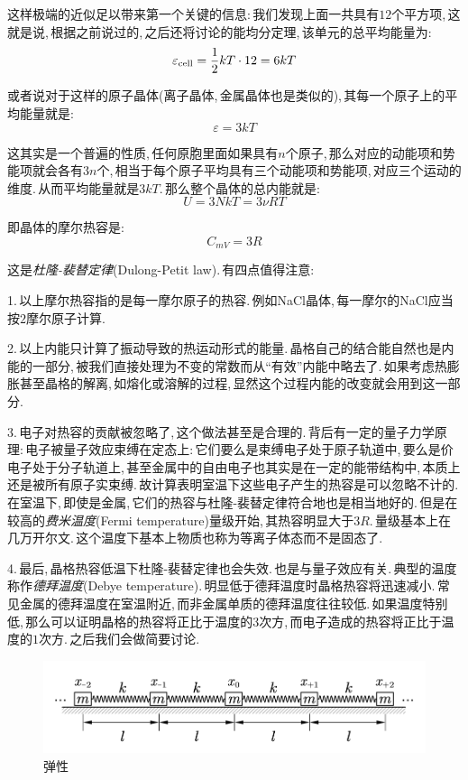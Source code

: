 这样极端的近似足以带来第一个关键的信息:\,我们发现上面一共具有$12$个平方项,\,这就是说,\,根据之前说过的,\,之后还将讨论的能均分定理,\,该单元的总平均能量为:
\[\varepsilon_{\rm cell}=\frac{1}{2}kT\cdot 12=6kT\]

或者说对于这样的原子晶体(离子晶体,\,金属晶体也是类似的),\,其每一个原子上的平均能量就是:
\[\varepsilon=3kT\]

这其实是一个普遍的性质,\,任何原胞里面如果具有$n$个原子,\,那么对应的动能项和势能项就会各有$3n$个,\,相当于每个原子平均具有三个动能项和势能项,\,对应三个运动的维度.\,从而平均能量就是$3kT$.\,那么整个晶体的总内能就是:
\[U=3NkT=3\nu RT\]

即晶体的摩尔热容是:
\[C_{mV}=3R\]

这是\emph{杜隆-裴替定律}(Dulong-Petit law).\,有四点值得注意:

1.\,以上摩尔热容指的是每一摩尔原子的热容.\,例如NaCl晶体,\,每一摩尔的NaCl应当按$2$摩尔原子计算.

2.\,以上内能只计算了振动导致的热运动形式的能量.\,晶格自己的结合能自然也是内能的一部分,\,被我们直接处理为不变的常数而从``有效''内能中略去了.\,如果考虑热膨胀甚至晶格的解离,\,如熔化或溶解的过程,\,显然这个过程内能的改变就会用到这一部分.

3.\,电子对热容的贡献被忽略了,\,这个做法甚至是合理的.\,背后有一定的量子力学原理:\,电子被量子效应束缚在定态上:\,它们要么是束缚电子处于原子轨道中,\,要么是价电子处于分子轨道上,\,甚至金属中的自由电子也其实是在一定的能带结构中,\,本质上还是被所有原子实束缚.\,故计算表明室温下这些电子产生的热容是可以忽略不计的.\,在室温下,\,即使是金属,\,它们的热容与杜隆-裴替定律符合地也是相当地好的.\,但是在较高的\emph{费米温度}(Fermi temperature)量级开始,\,其热容明显大于$3R$.\,量级基本上在几万开尔文.\,这个温度下基本上物质也称为等离子体态而不是固态了.

4.\,最后,\,晶格热容低温下杜隆-裴替定律也会失效.\,也是与量子效应有关.\,典型的温度称作\emph{德拜温度}(Debye temperature).\,明显低于德拜温度时晶格热容将迅速减小.\,常见金属的德拜温度在室温附近,\,而非金属单质的德拜温度往往较低.\,如果温度特别低,\,那么可以证明晶格的热容将正比于温度的$3$次方,\,而电子造成的热容将正比于温度的$1$次方.\,之后我们会做简要讨论.

\begin{figure}[H]
\centering
\includegraphics[width=15cm]{image/5-3-5.png}
\caption{弹性}
\end{figure}

